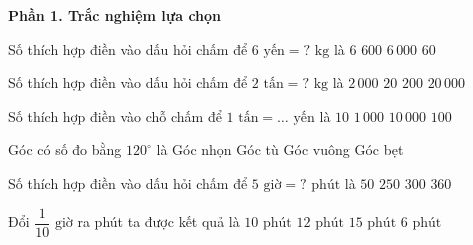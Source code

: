 \textbf{Phần 1. Trắc nghiệm lựa chọn}

\begin{ex} %
Số thích hợp điền vào dấu hỏi chấm để $6\text{ yến} = ?\text{ kg}$ là
\choice
{$6$}
{$600$}
{$6\,000$}
{\True $60$}
\end{ex}

\begin{ex} %
Số thích hợp điền vào dấu hỏi chấm để $2\text{ tấn} = ?\text{ kg}$ là
\choice
{\True $2\,000$}
{$20$}
{$200$}
{$20\,000$}
\end{ex}

\begin{ex} %
Số thích hợp điền vào chỗ chấm để $1\text{ tấn} = \dots\text{ yến}$ là
\choice
{$10$}
{$1\,000$}
{$10\,000$}
{\True $100$}
\end{ex}

\begin{ex} %
Góc có số đo bằng $120^\circ$ là
\choice
{Góc nhọn}
{\True Góc tù}
{Góc vuông}
{Góc bẹt}
\end{ex}

\begin{ex} %
Số thích hợp điền vào dấu hỏi chấm để $5\text{ giờ} = ?\text{ phút}$ là
\choice
{$50$}
{$250$}
{\True $300$}
{$360$}
\end{ex}

\begin{ex} %
Đổi $\dfrac{1}{10}\text{ giờ}$ ra phút ta được kết quả là
\choice
{$10\text{ phút}$}
{$12\text{ phút}$}
{$15\text{ phút}$}
{\True $6\text{ phút}$}
\end{ex}

